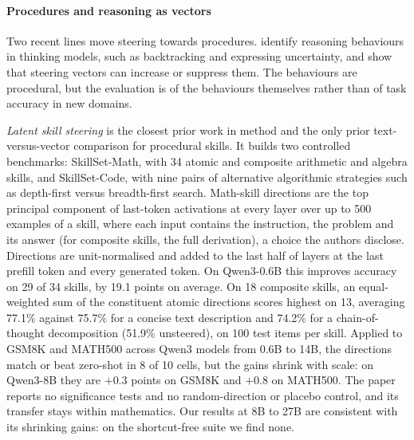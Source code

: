\documentclass[11pt]{article}
\begin{document}
\paragraph{Procedures and reasoning as vectors} Two recent lines move steering towards procedures.
\citet{venhoff2025reasoning} identify reasoning behaviours in thinking models, such as backtracking
and expressing uncertainty, and show that steering vectors can increase or suppress them. The
behaviours are procedural, but the evaluation is of the behaviours themselves rather than of task
accuracy in new domains.

\emph{Latent skill steering} \citep{jiang2026latent} is the closest prior work in method and the
only prior text-versus-vector comparison for procedural skills. It builds two controlled benchmarks:
SkillSet-Math, with 34 atomic and composite arithmetic and algebra skills, and SkillSet-Code, with
nine pairs of alternative algorithmic strategies such as depth-first versus breadth-first search.
Math-skill directions are the top principal component of last-token activations at every layer over
up to 500 examples of a skill, where each input contains the instruction, the problem and its answer
(for composite skills, the full derivation), a choice the authors disclose. Directions are
unit-normalised and added to the last half of layers at the last prefill token and every generated
token. On Qwen3-0.6B this improves accuracy on 29 of 34 skills, by 19.1 points on average. On 18
composite skills, an equal-weighted sum of the constituent atomic directions scores highest on 13,
averaging 77.1\% against 75.7\% for a concise text description and 74.2\% for a chain-of-thought
decomposition (51.9\% unsteered), on 100 test items per skill. Applied to GSM8K and MATH500
\citep{cobbe2021gsm8k,hendrycks2021math} across Qwen3 models from 0.6B to 14B, the directions match
or beat zero-shot in 8 of 10 cells, but the gains shrink with scale: on Qwen3-8B they are $+0.3$
points on GSM8K and $+0.8$ on MATH500. The paper reports no significance tests and no
random-direction or placebo control, and its transfer stays within mathematics. Our results at 8B to
27B are consistent with its shrinking gains: on the shortcut-free suite we find none.
\end{document}
